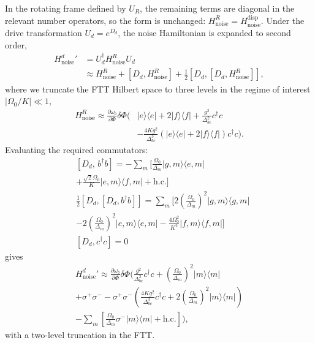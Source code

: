 In the rotating frame defined by $U_R$, the remaining terms are diagonal in the relevant number operators, so the form is unchanged: $H_{\text{noise}}^R = H_{\text{noise}}^{\text{disp}}$.
Under the drive transformation $U_d = e^{D_d}$, the noise Hamiltonian is expanded to second order,
\begin{align}
    {H_{\text{noise}}^d}' &= U_d^\dagger H_{\text{noise}}^R U_d \nonumber \\
    &\approx H_{\text{noise}}^R + [D_d, H_{\text{noise}}^R] + \frac{1}{2} [D_d, [D_d, H_{\text{noise}}^R]] \nonumber ,
\end{align}
where we truncate the FTT Hilbert space to three levels in the regime of interest $|\Omega_0/K|\ll1$,
\begin{equation}
\begin{split}
    H_{\text{noise}}^R \approx \frac{\partial \omega_b}{\partial \Phi} \delta \Phi \bigg( & |e\rangle\langle e| + 2|f\rangle\langle f| + \frac{g^2}{\Delta^2_{bc}} c^\dagger c \\
    & - \frac{4Kg^2}{\Delta_{bc}^3} \left( |e\rangle\langle e| + 2|f\rangle\langle f| \right) c^\dagger c \bigg).
\end{split}
\end{equation}
Evaluating the required commutators:
\begin{align}
    &\left[ D_d, \, b^\dagger b\right] = -\sum_m \big[ \frac{\Omega_0}{\Delta_m} |g,m\rangle \langle e,m| \nonumber \\
    &+ \frac{\sqrt{2}\Omega_0}{K} |e,m\rangle \langle f,m| + \text{h.c.} \big] \nonumber\\
    &\frac{1}{2} \left[ D_d, \left[ D_d, b^\dagger b \right] \right]= \sum_m \Bigg[ 2 \left( \frac{\Omega_0}{\Delta_m} \right)^2 |g,m\rangle\langle g,m| \nonumber \\
    &- 2 \left( \frac{\Omega_0}{\Delta_m} \right)^2 |e,m\rangle\langle e,m|   - \frac{4\Omega_0^2}{K^2} |f,m\rangle\langle f,m| \Bigg]\nonumber \\
    &[D_d,c^\dagger c] = 0
\end{align}
gives
\begin{multline}
\label{eq:noise_Hamiltoniand}
    {H_{\text{noise}}^d}' \approx \frac{\partial \omega_b}{\partial \Phi} \delta \Phi \Bigg(  \frac{g^2}{\Delta_{bc}^2} c^\dagger c + \left(\frac{\Omega_0}{\Delta_m}\right)^2 |m\rangle\langle m| \\
    +\sigma^+ \sigma^-- \sigma^+ \sigma^- \left( \frac{4Kg^2}{\Delta_{bc}^3} c^\dagger c + 2\left(\frac{\Omega_0}{\Delta_m}\right)^2 |m\rangle\langle m| \right) \\
    - \sum_m \left[ \frac{\Omega_0}{\Delta_m} \sigma^- |m\rangle\langle m| + \text{h.c.} \right]\Bigg),
\end{multline}
with a two-level truncation in the FTT.

